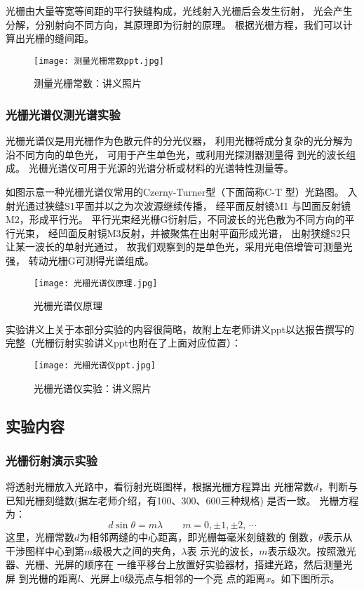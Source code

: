 \documentclass[11pt]{article}
\begin{document}
光栅由大量等宽等间距的平行狭缝构成，光线射入光栅后会发生衍射，
光会产生分解，分别射向不同方向，其原理即为衍射的原理。
根据光栅方程，我们可以计算出光栅的缝间距。

\begin{figure}[H]
    \centering
    \texttt{[image: 测量光栅常数ppt.jpg]}
    \caption{测量光栅常数：讲义照片}
\end{figure}


\subsubsection*{光栅光谱仪测光谱实验}

光栅光谱仪是用光栅作为色散元件的分光仪器，
利用光栅将成分复杂的光分解为沿不同方向的单色光，
可用于产生单色光，或利用光探测器测量得
到光的波长组成。
光栅光谱仪可用于光源的光谱分析或材料的光谱特性测量等。

如图示意一种光栅光谱仪常用的Czerny-Turner型（下面简称C-T 型）光路图。
入射光通过狭缝S1平面并以之为次波源继续传播，
经平面反射镜M1 与凹面反射镜M2，形成平行光。
平行光束经光栅G衍射后，不同波长的光色散为不同方向的平行光束，
经凹面反射镜M3反射，并被聚焦在出射平面形成光谱，
出射狭缝S2只让某一波长的单射光通过，
故我们观察到的是单色光，采用光电倍增管可测量光强，
转动光栅G可测得光谱组成。

\begin{figure}[H]
    \centering
    \texttt{[image: 光栅光谱仪原理.jpg]}
    \caption{光栅光谱仪原理}
\end{figure}

实验讲义上关于本部分实验的内容很简略，故附上左老师讲义ppt以达报告撰写的完整（光栅衍射实验讲义ppt也附在了上面对应位置）：

\begin{figure}[H]
    \centering
    \texttt{[image: 光栅光谱仪ppt.jpg]}
    \caption{光栅光谱仪实验：讲义照片}
\end{figure}


\subsection{实验内容}

\subsubsection*{光栅衍射演示实验}

将透射光栅放入光路中，看衍射光斑图样，根据光栅方程算出
光栅常数$d$，判断与已知光栅刻缝数(据左老师介绍，有100、300、600三种规格)
是否一致。
光栅方程为：
\[d\sin{\theta} = m\lambda \qquad m=0,\pm 1,\pm 2,\,\cdots\]
这里，光栅常数$d$为相邻两缝的中心距离，即光栅每毫米刻缝数的
倒数，$\theta$表示从干涉图样中心到第$m$级极大之间的夹角，$\lambda$表
示光的波长，$m$表示级次。按照激光器、光栅、光屏的顺序在
一维平移台上放置好实验器材，搭建光路，然后测量光屏
到光栅的距离$l$、光屏上0级亮点与相邻的一个亮
点的距离$x$。如下图所示。
\end{document}

